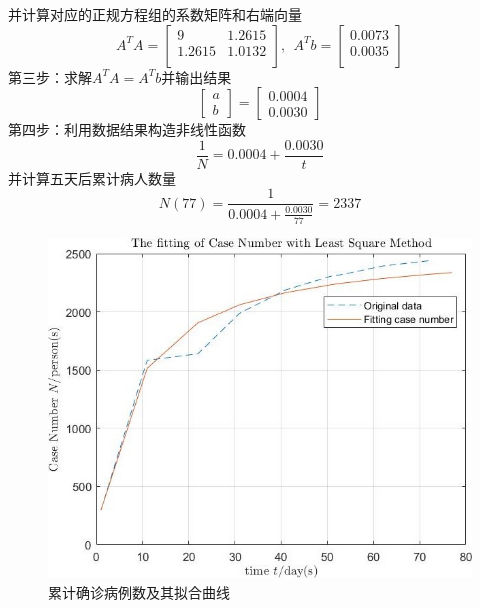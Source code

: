 \documentclass[10pt,a4paper]{article}
\begin{document}
并计算对应的正规方程组的系数矩阵和右端向量
\[
A^TA=\left[\begin{array}{cc}
9 & 1.2615 \\
1.2615 & 1.0132 \\
\end{array}\right],~~A^Tb=\left[\begin{array}{c}
0.0073 \\
0.0035 \\
\end{array}\right]
\]
第三步：求解$A^TA=A^Tb$并输出结果
\[
\left[\begin{array}{l}a\\b\end{array}\right]=\left[\begin{array}{l}0.0004\\0.0030\end{array}\right]
\]
第四步：利用数据结果构造非线性函数
\[
\frac{1}{N}=0.0004+\frac{0.0030}{t}
\]
并计算五天后累计病人数量
\[
N(77)=\frac{1}{0.0004+\frac{0.0030}{77}}=2337
\]
\begin{figure}[H]
\centering
\includegraphics[scale=.5]{3.jpg}
\caption{累计确诊病例数及其拟合曲线}
\end{figure}
\end{document}
